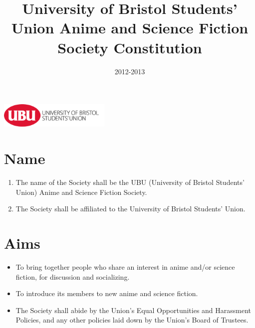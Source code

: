 \documentclass[a4paper,10pt]{article}
\title{University of Bristol Students' Union Anime and Science Fiction Society Constitution}
\author{}
\date{2012-2013}
\begin{document}
\maketitle
\vfill
\includegraphics[height=1.2cm,keepaspectratio=true]{./images/ubu-logo.png}



\pagebreak
\section{Name}
\begin{enumerate}
  \item The name of the Society shall be the UBU (University of Bristol Students' Union) Anime and Science Fiction Society.
  \item The Society shall be affiliated to the University of Bristol Students' Union.
\end{enumerate}

\section{Aims}
\begin{itemize}
  \item To bring together people who share an interest in anime and/or science fiction, for discussion and socializing.
  \item To introduce its members to new anime and science fiction.
  \item The Society shall abide by the Union's Equal Opportunities and Harassment Policies, and any other policies laid down by the Union's Board of Trustees.
\end{itemize}
\end{document}
